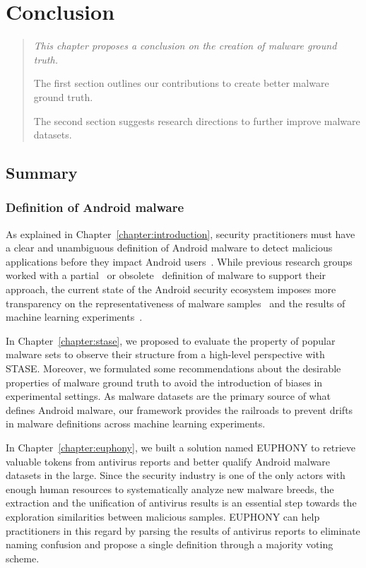 \chapter{Conclusion}
\label{chapter:conclusion}

\begin{quote}
{\itshape
This chapter proposes a conclusion on the creation of malware ground truth.

The first section outlines our contributions to create better malware ground truth.

The second section suggests research directions to further improve malware datasets.
}
\end{quote}

\localtableofcontents{}

\section{Summary}
\subsection{Definition of Android malware}
As explained in Chapter~\ref{chapter:introduction}, security practitioners must have a clear and unambiguous definition of Android malware to detect malicious applications before they impact Android users~\cite{sommer_outside_2010,rossow_prudent_2012}.
While previous research groups worked with a partial~\cite{arp_drebin:_2014} or obsolete~\cite{zhou_dissecting_2012} definition of malware to support their approach, the current state of the Android security ecosystem\cite{google_android_2018} imposes more transparency on the representativeness of malware samples~\cite{canto_large_2017} and the results of machine learning experiments~\cite{allix_empirical_2016}.

In Chapter~\ref{chapter:stase}, we proposed to evaluate the property of popular malware sets to observe their structure from a high-level perspective with STASE.
Moreover, we formulated some recommendations about the desirable properties of malware ground truth to avoid the introduction of biases in experimental settings.
As malware datasets are the primary source of what defines Android malware, our framework provides the railroads to prevent drifts in malware definitions across machine learning experiments.

In Chapter~\ref{chapter:euphony}, we built a solution named EUPHONY to retrieve valuable tokens from antivirus reports and better qualify Android malware datasets in the large.
Since the security industry is one of the only actors with enough human resources to systematically analyze new malware breeds, the extraction and the unification of antivirus results is an essential step towards the exploration similarities between malicious samples.
EUPHONY can help practitioners in this regard by parsing the results of antivirus reports to eliminate naming confusion and propose a single definition through a majority voting scheme.

